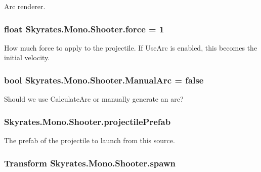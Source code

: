 Arc renderer. 

\hypertarget{class_skyrates_1_1_mono_1_1_shooter_a472c3ebcb2adf214c1fbeafd7c32c0ae}{
\subsubsection[{force}]{\setlength{\rightskip}{0pt plus 5cm}float Skyrates.\-Mono.\-Shooter.\-force = 1}}\label{class_skyrates_1_1_mono_1_1_shooter_a472c3ebcb2adf214c1fbeafd7c32c0ae}


How much force to apply to the projectile. If Use\-Arc is enabled, this becomes the initial velocity. 

\hypertarget{class_skyrates_1_1_mono_1_1_shooter_a1c85cc6a77bdcddc41c7cf70506f3309}{
\subsubsection[{Manual\-Arc}]{\setlength{\rightskip}{0pt plus 5cm}bool Skyrates.\-Mono.\-Shooter.\-Manual\-Arc = false}}\label{class_skyrates_1_1_mono_1_1_shooter_a1c85cc6a77bdcddc41c7cf70506f3309}


Should we use Calculate\-Arc or manually generate an arc? 

\hypertarget{class_skyrates_1_1_mono_1_1_shooter_a3eb3006b65f8ca3e5640e2d04658139f}{
\subsubsection[{projectile\-Prefab}]{ Skyrates.\-Mono.\-Shooter.\-projectile\-Prefab}}\label{class_skyrates_1_1_mono_1_1_shooter_a3eb3006b65f8ca3e5640e2d04658139f}


The prefab of the projectile to launch from this source. 

\hypertarget{class_skyrates_1_1_mono_1_1_shooter_aa936f850ff75524adc350c2c3a6763ed}{
\subsubsection[{spawn}]{\setlength{\rightskip}{0pt plus 5cm}Transform Skyrates.\-Mono.\-Shooter.\-spawn}}\label{class_skyrates_1_1_mono_1_1_shooter_aa936f850ff75524adc350c2c3a6763ed}


